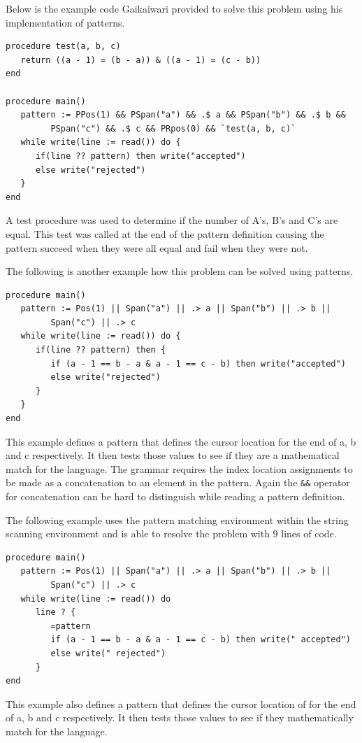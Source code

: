 \documentclass{article}
\begin{document}
Below is the example code Gaikaiwari provided to solve this problem using his implementation of patterns.  
\begin{verbatim}
procedure test(a, b, c)
   return ((a - 1) = (b - a)) & ((a - 1) = (c - b))
end

procedure main()
   pattern := PPos(1) && PSpan("a") && .$ a && PSpan("b") && .$ b && 
         PSpan("c") && .$ c && PRpos(0) && `test(a, b, c)`
   while write(line := read()) do {
      if(line ?? pattern) then write("accepted")
      else write("rejected")
   }
end
\end{verbatim}
A test procedure was used to determine if the number of A's, B's and C's are equal.  This test was called at the end of the pattern definition causing the pattern succeed when they were all equal and fail when they were not.

The following is another example how this problem can be solved using patterns.
\begin{verbatim}
procedure main()
   pattern := Pos(1) || Span("a") || .> a || Span("b") || .> b || 
         Span("c") || .> c
   while write(line := read()) do {
      if(line ?? pattern) then {
         if (a - 1 == b - a & a - 1 == c - b) then write("accepted")
         else write("rejected")
      }
   }
end
\end{verbatim}
This example defines a pattern that defines the cursor location for the end of a, b and c respectively.  It then tests those values to see if they are a mathematical match for the language.  The grammar requires the index location assignments to be made as a concatenation to an element in the pattern.  Again the \texttt{\&\&} operator for concatenation can be hard to distinguish while reading a pattern definition.

The following example uses the pattern matching environment within the string scanning environment and is able to resolve the problem with 9 lines of code.
\begin{verbatim}
procedure main()
   pattern := Pos(1) || Span("a") || .> a || Span("b") || .> b ||
         Span("c") || .> c 
   while write(line := read()) do
      line ? {
         =pattern
         if (a - 1 == b - a & a - 1 == c - b) then write(" accepted")
         else write(" rejected")
      }
end
\end{verbatim}
This example also defines a pattern that defines the cursor location of for the end of a, b and c respectively.  It then tests those values to see if they mathematically match for the language.
\end{document}
